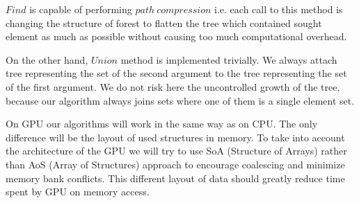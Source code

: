 $Find$ is capable of performing $path\ compression$ i.e. each call to this method is changing the structure of forest to flatten the tree which contained sought element as much as possible without causing too much computational overhead.

On the other hand, $Union$ method is implemented trivially. We always attach tree representing the set of the second argument to the tree representing the set of the first argument. We do not risk here the uncontrolled growth of the tree, because our algorithm always joins sets where one of them is a single element set.

On GPU our algorithms will work in the same way as on CPU. The only difference will be the layout of used structures in memory. To take into account the architecture of the GPU we will try to use SoA (Structure of Arrays) rather than AoS (Array of Structures) approach to encourage coalescing and minimize memory bank conflicts. This different layout of data should greatly reduce time spent by GPU on memory access.
